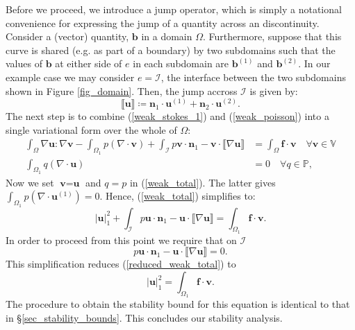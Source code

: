 \documentclass[12pt,a4paper]{article}
\theoremstyle{definition}
\begin{document}
Before we proceed, we introduce a jump operator, which is simply a notational convenience for expressing the jump of a quantity across an discontinuity.  Consider a (vector) quantity, $\textbf{b}$ in a domain $\Omega$.   Furthermore, suppose that this curve is shared (e.g. as part of a boundary) by two subdomains such that the values of $\textbf{b}$ at either side of $e$ in each subdomain are $\textbf{b}^{\left(1\right)}$ and $\textbf{b}^{\left(2\right)}$. In our example case we may consider $e = \mathcal{I}$, the interface between the two subdomains shown in Figure \ref{fig_domain}.  Then, the jump accross $\mathcal{I}$ is given by:
\begin{equation}
\llbracket \textbf{u} \rrbracket \coloneqq \textbf{n}_1\cdot \textbf{u}^{\left(1\right)}+\textbf{n}_2\cdot  \textbf{u}^{\left(2\right)}.
\end{equation}
The next step is to combine (\ref{weak_stokes_1}) and (\ref{weak_poisson}) into a single variational form over the whole of $\Omega$:
\begin{equation}\label{weak_total}
\begin{aligned}
\int_{\Omega}\nabla \textbf{u} : \nabla \textbf{v}-\int_{\Omega_1}p\left(\nabla \cdot \textbf{v}\right) +\int_{\mathcal{I}} p\textbf{v}\cdot \textbf{n}_1-\textbf{v}\cdot\llbracket\nabla\textbf{u}\rrbracket &=\int_{\Omega}\textbf{f}\cdot \textbf{v} \quad \forall  \textbf{v}\in \mathbb{V}\\
\int_{\Omega_1}q\left(\nabla \cdot \textbf{u}\right) &= 0\quad \forall q\in \mathbb{P},
\end{aligned}
\end{equation}
Now we set $\textbf{v}=\textbf{u}$  and $q=p$ in (\ref{weak_total}).  The latter gives $\int_{\Omega_1}p\left(\nabla \cdot \textbf{u}^{\left(1\right)}\right)=0$.  Hence, (\ref{weak_total}) simplifies to:
\begin{equation}\label{reduced_weak_total}
	\left|\textbf{u}\right|_1^2 + \int_{\mathcal{I}}p\textbf{u}\cdot \textbf{n}_1-\textbf{u}\cdot\llbracket \nabla \textbf{u}\rrbracket =\int_{\Omega_1}\textbf{f}\cdot \textbf{v}.
\end{equation}
In order to proceed from this point we require that on $\mathcal{I}$
\begin{equation}
p\textbf{u}\cdot \textbf{n}_1-\textbf{u}\cdot \llbracket \nabla \textbf{u}\rrbracket=0.
\end{equation}
This simplification reduces (\ref{reduced_weak_total}) to 
\begin{equation}
\left|\textbf{u}\right|_1^2 =\int_{\Omega_1}\textbf{f}\cdot \textbf{v}.
\end{equation}
The procedure to obtain the stability bound for this equation is identical to that in \S \ref{sec_stability_bounds}.  This concludes our stability analysis.
\end{document}
